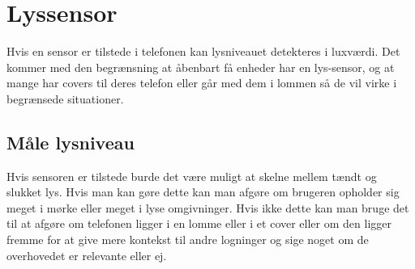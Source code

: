 \section{Lyssensor}
Hvis en sensor er tilstede i telefonen kan lysniveauet detekteres i luxværdi. Det kommer med den begrænsning at åbenbart få enheder har en lys-sensor, og at mange har covers til deres telefon eller går med dem i lommen så de vil virke i begrænsede situationer.

\subsection{Måle lysniveau}
Hvis sensoren er tilstede burde det være muligt at skelne mellem tændt og slukket lys. Hvis man kan gøre dette kan man afgøre om brugeren opholder sig meget i mørke eller meget i lyse omgivninger. Hvis ikke dette kan man bruge det til at afgøre om telefonen ligger i en lomme eller i et cover eller om den ligger fremme for at give mere kontekst til andre logninger og sige noget om de overhovedet er relevante eller ej.


